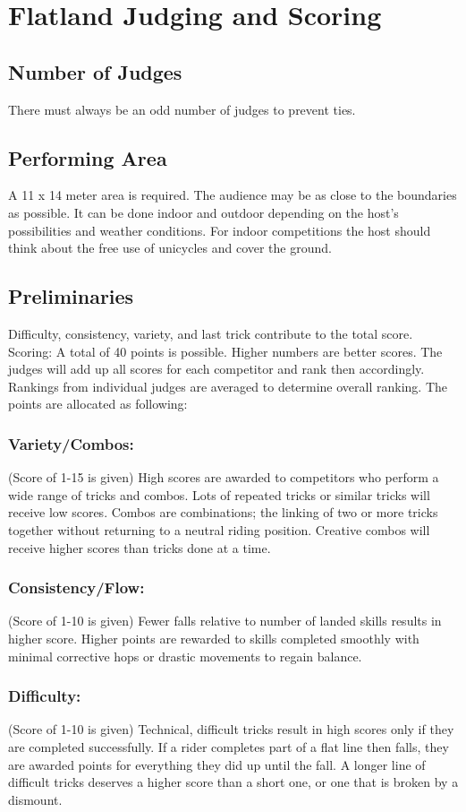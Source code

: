 \section{Flatland Judging and Scoring}
\subsection{Number of Judges}
There must always be an odd number of judges to prevent ties. 
\subsection{Performing Area}
A 11 x 14 meter area is required. The audience may be as close to the boundaries as possible. It can be done indoor and outdoor depending on the host's possibilities and weather conditions. For indoor competitions the host should think about the free use of unicycles and cover the ground.
\subsection{Preliminaries}
Difficulty, consistency, variety, and last trick contribute to the total score. Scoring: A total of 40 points is possible. Higher numbers are better scores. The judges will add up all scores for each competitor and rank then accordingly. Rankings from individual judges are averaged to determine overall ranking. The points are allocated as following: 
\subsubsection{Variety/Combos:}
(Score of 1-15 is given) High scores are awarded to competitors who perform a wide range of tricks and combos. Lots of repeated tricks or similar tricks will receive low scores. Combos are combinations; the linking of two or more tricks together without returning to a neutral riding position. Creative combos will receive higher scores than tricks done at a time.
\subsubsection{Consistency/Flow:}
(Score of 1-10 is given) Fewer falls relative to number of landed skills results in higher score. Higher points are rewarded to skills completed smoothly with minimal corrective hops or drastic movements to regain balance.
\subsubsection{Difficulty:}
(Score of 1-10 is given) Technical, difficult tricks result in high scores only if they are completed successfully. If a rider completes part of a flat line then falls, they are awarded points for everything they did up until the fall. A longer line of difficult tricks deserves a higher score than a short one, or one that is broken by a dismount.
